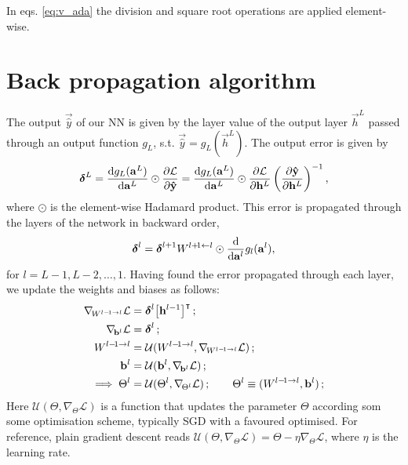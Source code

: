 In eqs. \eqref{eq:v_ada} the division and square root operations are applied element-wise. 




\section{Back propagation algorithm}\label{app:backprop}
    The output $\vec{\hat{y}}$ of our NN is given by the layer value of the output layer $\vec{h}^L$ passed through an output function $g_L$, s.t. $\vec{\hat{y}} = g_L(\vec{h}^L)$. The output error is given by
    \begin{equation}\label{eq:app_backprop_output_error}
        \boldsymbol{\delta}^L = \dv{g_L(\mathbf{a}^L)}{\mathbf{a}^L} \odot \pdv{\mathcal{L}}{\mathbf{\hat{y}}} =\dv{g_L(\mathbf{a}^L)}{\mathbf{a}^L} \odot \pdv{\mathcal{L}}{\mathbf{h}^L}\left( \pdv{\mathbf{\hat{y}}}{\mathbf{h}^L} \right)^{-1},
    \end{equation}
    where $\odot$ is the element-wise Hadamard product. This error is propagated through the layers of the network in backward order,
    \begin{equation}\label{eq:app_backprop_prop_error}
        \boldsymbol{\delta}^l = \boldsymbol{\delta}^{l+1}W^{l+\!1\leftarrow l} \odot \dv{}{\mathbf{a}^l}g_l(\mathbf{a}^l),
    \end{equation}
    for $l=L-1, L-2,\dots, 1$. Having found the error propagated through each layer, we update the weights and biases as follows:
    \begin{equation}\label{eq:app_backprop_update}
        \begin{split}
            \nabla_{\!W^{l-\!1\to l}} \mathcal{L} &= \svec{\delta}^l\big[\vec{h}^{l-1}\big]\TT\,; \\
            \nabla_{\!\vec{b}^l} \mathcal{L}&= \svec{\delta}^l\,; \\
            W^{l-\!1\to l} &= \mathcal{U}(W^{l-\! 1 \to l}, \nabla_{\!W^{l-\! 1\to l}} \mathcal{L})\,;\\
            \vec{b}^l &= \mathcal{U}(\vec{b}^l, \nabla_{\!\vec{b}^l} \mathcal{L})\,; \\
            \implies \Theta^l &= \mathcal{U}(\Theta^l, \nabla_{\!\Theta^l}\mathcal{L}) \,;\quad\quad \Theta^l \equiv (W^{l-\! 1 \to l}, \vec{b}^l) \,;
        \end{split}
    \end{equation}
    Here $\mathcal{U}(\Theta, \nabla_{\!\Theta}\mathcal{L})$ is a function that updates the parameter $\Theta$ according som some optimisation scheme, typically SGD with a favoured optimised. For reference, plain gradient descent reads $\mathcal{U}(\Theta, \nabla_{\!\Theta}\mathcal{L}) =\Theta - \eta\nabla_{\!\Theta}\mathcal{L}$, where $\eta$ is the learning rate. 


